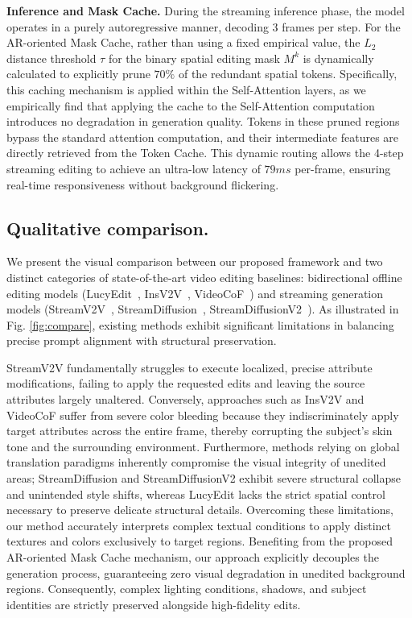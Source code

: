 \noindent \textbf{Inference and Mask Cache.} During the streaming inference phase, the model operates in a purely autoregressive manner, decoding 3 frames per step. For the AR-oriented Mask Cache, rather than using a fixed empirical value, the $L_2$ distance threshold $\tau$ for the binary spatial editing mask $M^k$ is dynamically calculated to explicitly prune $70\%$ of the redundant spatial tokens. Specifically, this caching mechanism is applied within the Self-Attention layers, as we empirically find that applying the cache to the Self-Attention computation introduces no degradation in generation quality. Tokens in these pruned regions bypass the standard attention computation, and their intermediate features are directly retrieved from the Token Cache. This dynamic routing allows the 4-step streaming editing to achieve an ultra-low latency of $79ms$ per-frame, ensuring real-time responsiveness without background flickering.


\subsection{Qualitative comparison.}


\label{subsec:qualitative_comparison}

We present the visual comparison between our proposed framework and two distinct categories of state-of-the-art video editing baselines: bidirectional offline editing models (LucyEdit~\cite{decart2025lucyedit}, InsV2V~\cite{cheng2023consistent}, VideoCoF~\cite{yang2025unified}) and streaming generation models (StreamV2V~\cite{liang2024looking}, StreamDiffusion~\cite{kodaira2025streamdiffusion}, StreamDiffusionV2~\cite{feng2025streamdiffusionv2}). As illustrated in Fig. \ref{fig:compare}, existing methods exhibit significant limitations in balancing precise prompt alignment with structural preservation.

StreamV2V fundamentally struggles to execute localized, precise attribute modifications, failing to apply the requested edits and leaving the source attributes largely unaltered. Conversely, approaches such as InsV2V and VideoCoF suffer from severe color bleeding because they indiscriminately apply target attributes across the entire frame, thereby corrupting the subject's skin tone and the surrounding environment. Furthermore, methods relying on global translation paradigms inherently compromise the visual integrity of unedited areas; StreamDiffusion and StreamDiffusionV2 exhibit severe structural collapse and unintended style shifts, whereas LucyEdit lacks the strict spatial control necessary to preserve delicate structural details. Overcoming these limitations, our method accurately interprets complex textual conditions to apply distinct textures and colors exclusively to target regions. Benefiting from the proposed AR-oriented Mask Cache mechanism, our approach explicitly decouples the generation process, guaranteeing zero visual degradation in unedited background regions. Consequently, complex lighting conditions, shadows, and subject identities are strictly preserved alongside high-fidelity edits.



